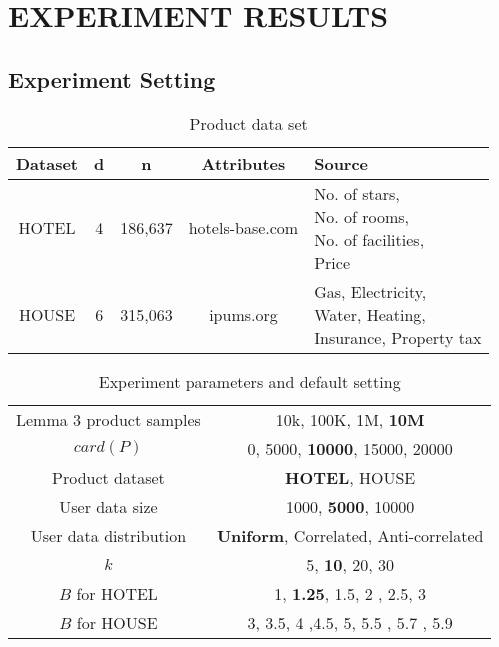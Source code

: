 \chapter{EXPERIMENT RESULTS}
\label{chap:exp}


\section{Experiment Setting}


\begin{table}[hbt]
  \caption{Product data set}
  \label{tab: parameter1}
  \centering
  \begin{tabular}{c|c|c|c|p{5cm}}
    \toprule
    Dataset & d & n & Attributes & Source \\
    \midrule 
    \midrule
    HOTEL  & 4 & 186,637 & hotels-base.com& \parbox{5cm}{No. of stars,\\ No. of rooms, \\No. of facilities, \\Price} \\
    \midrule
    HOUSE  & 6 & 315,063& ipums.org & \parbox{5cm}{Gas, Electricity,\\ Water, Heating,\\ Insurance, Property tax} \\
  \bottomrule
\end{tabular}
\end{table}

\begin{table}[hbt]
  \caption{Experiment parameters and default setting}
  \label{tab: parameter2}
  \centering
  \begin{tabular}{c|c}
    \toprule
    Lemma 3 product samples & 10k, 100K, 1M, {\bfseries 10M}\\
    $card(P)$ &  0, 5000, {\bfseries 10000}, 15000, 20000 \\
    Product dataset & {\bfseries HOTEL}, HOUSE\\
    User data size   & 1000, {\bfseries 5000}, 10000      \\
    User data distribution  & {\bfseries Uniform}, Correlated, Anti-correlated  \\
    $k$ & 5, {\bfseries 10}, 20, 30 \\
    $B$ for HOTEL & 1, {\bfseries 1.25}, 1.5, 2 , 2.5, 3\\
    $B$ for HOUSE & 3, 3.5, 4 ,4.5, 5, 5.5 , 5.7 , 5.9\\
  \bottomrule
\end{tabular}
\end{table}

